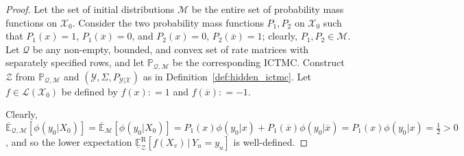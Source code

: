 \documentclass[twoside,11pt]{article}
\newcommand{\states}{\mathcal{X}}
\newcommand{\observs}{\mathcal{Y}}
\newcommand{\uexp}{\overline{\mathbb{E}}_{\rateset,\mathcal{M}}}
\newcommand{\gambles}{\mathcal{L}}
\newcommand{\rateset}{\mathcal{Q}}
\newcommand{\coloneqq}{:\!=}
\begin{document}
\begin{proof}
Let the set of initial distributions $\mathcal{M}$ be the entire set of probability mass functions on $\states_0$. Consider the two probability mass functions $P_1,P_2$ on $\states_0$ such that $P_1(x)=1$, $P_1(\overline{x})=0$, and $P_2(x)=0$, $P_2(\overline{x})=1$; clearly, $P_1,P_2\in\mathcal{M}$. Let $\rateset$ be any non-empty, bounded, and convex set of rate matrices with separately specified rows, and let $\mathbb{P}_{\rateset,\mathcal{M}}$ be the corresponding ICTMC. Construct $\mathcal{Z}$ from $\mathbb{P}_{\rateset,\mathcal{M}}$ and $(\observs,\Sigma,P_{\observs\vert\states})$ as in Definition~\ref{def:hidden_ictmc}. Let $f\in\gambles(\states_0)$ be defined by $f(x)\coloneqq 1$ and $f(\overline{x})\coloneqq -1$. 

Clearly, $\uexp[\phi(y_0\vert X_0)]=\overline{\mathbb{E}}_\mathcal{M}[\phi(y_0\vert X_0)] = P_1(x)\phi(y_0\vert x) + P_1(\overline{x})\phi(y_0\vert \overline{x})=P_1(x)\phi(y_0\vert x) = \frac{1}{2}>0$, and so the lower expectation $\underline{\mathbb{E}}_\mathcal{Z}^\mathrm{R}[f(X_v)\,\vert\, Y_u=y_u]$ is well-defined.


\end{proof}
\end{document}
